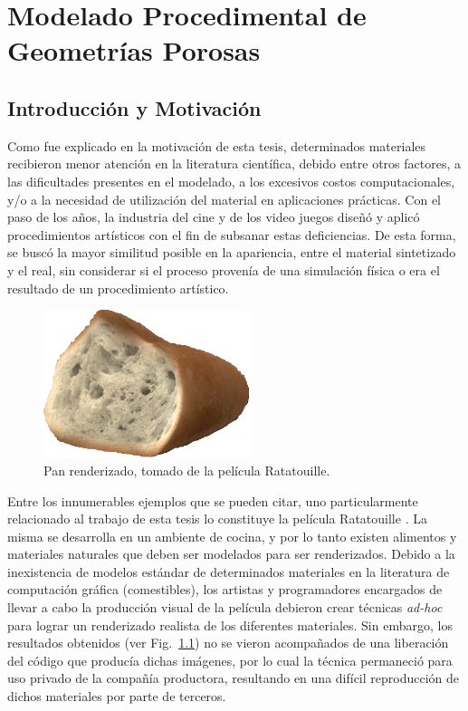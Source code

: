\chapter[Modelado Procedimental de Geometrías Porosas]{Modelado Procedimental de Geometrías Porosas}

\section{Introducción y Motivación} %
Como fue explicado en la motivación de esta tesis, determinados materiales recibieron menor atención en la literatura científica, debido entre otros factores, a las dificultades presentes	 en el modelado, a los excesivos costos computacionales, y/o a la necesidad de utilización del material en aplicaciones prácticas.
Con el paso de los a\~nos, la industria del cine y de los video juegos diseñó y aplicó procedimientos artísticos con el fin de subsanar estas deficiencias.
De esta forma, se busc\'o la mayor similitud posible en la apariencia, entre el material sintetizado y el real, sin considerar si el proceso provenía de una simulación física o era el resultado de un procedimiento artístico.

\begin{figure}
\centerline{\includegraphics[width=6cm]{figures/ratatouille}}
\caption[Pan renderizado, tomado de la película Ratatouille]{Pan renderizado, tomado de la película Ratatouille.}
\label{fg:ratatouille}
\end{figure}

Entre los innumerables ejemplos que se pueden citar, uno particularmente relacionado al trabajo de esta tesis lo constituye la película Ratatouille \cite{Cho2007}.
La misma se desarrolla en un ambiente de cocina, y por lo tanto existen alimentos y materiales naturales que deben ser modelados para ser renderizados.
Debido a la inexistencia de modelos estándar de determinados materiales en la literatura de computación gráfica (comestibles), los artistas y programadores encargados de llevar a cabo la producción visual de la película debieron crear técnicas {\em ad-hoc} para lograr un renderizado realista de los diferentes materiales.
Sin embargo, los resultados obtenidos (ver Fig.~\ref{fg:ratatouille}) no se vieron acompañados de una liberación del código que producía dichas imágenes, por lo cual la técnica permaneció para uso privado de la compañía productora, resultando en una difícil reproducción de dichos materiales por parte de terceros.


